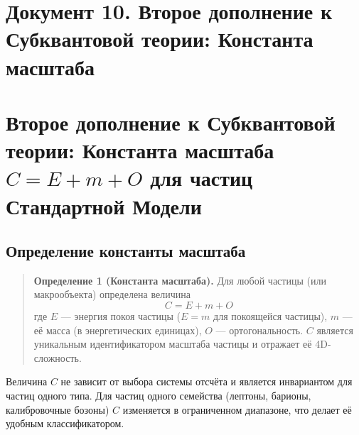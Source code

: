 \documentclass[12pt,a4paper]{article}
\begin{document}
\newpage
\section*{Документ 10. Второе дополнение к Субквантовой теории: Константа масштаба}

\section{Второе дополнение к Субквантовой теории: Константа масштаба $C = E + m + O$ для частиц Стандартной Модели}

\begin{abstract}
В данном дополнении вводится понятие константы масштаба $C = E + m + O$ --- уникального идентификатора частицы, отражающего её 4D-сложность. На основе трёх моделей ортогональности (линейной, логарифмической и упрощённой) вычислены значения $C$ для всех фундаментальных частиц Стандартной Модели. Показано, что $C$ слабо зависит от выбора эталона ортогональности и может служить устойчивой характеристикой масштаба. Для стабильных частиц $C$ лежит в диапазоне $1$--$2000$, для нестабильных --- достигает десятков и сотен тысяч. Для макрообъектов $C$ пропорциональна их массе. Дополнение содержит полные таблицы значений, готовые для экспериментальной проверки.
\end{abstract}

\subsection{Определение константы масштаба}

\begin{quote}
\textbf{Определение 1 (Константа масштаба).} Для любой частицы (или макрообъекта) определена величина
\begin{equation}
    C = E + m + O
\end{equation}
где $E$ --- энергия покоя частицы ($E = m$ для покоящейся частицы), $m$ --- её масса (в энергетических единицах), $O$ --- ортогональность. $C$ является уникальным идентификатором масштаба частицы и отражает её 4D-сложность.
\end{quote}

Величина $C$ не зависит от выбора системы отсчёта и является инвариантом для частиц одного типа. Для частиц одного семейства (лептоны, барионы, калибровочные бозоны) $C$ изменяется в ограниченном диапазоне, что делает её удобным классификатором.
\end{document}
